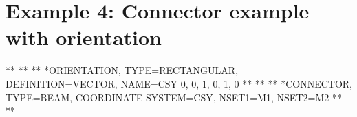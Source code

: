 \section{Example 4: Connector example with orientation}

\begin{codeBlock}
**
**
**
*ORIENTATION, TYPE=RECTANGULAR, DEFINITION=VECTOR, NAME=CSY
0, 0, 1, 0, 1, 0
**
**
**
*CONNECTOR, TYPE=BEAM, COORDINATE SYSTEM=CSY, NSET1=M1, NSET2=M2
**
**
\end{codeBlock}

\newpage

